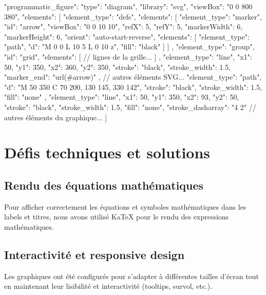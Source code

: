 \documentclass{article}
\begin{document}
\begin{tcolorbox}
"programmatic_figure": {
  "type": "diagram",
  "library": "svg",
  "viewBox": "0 0 800 380",
  "elements": [
    {
      "element_type": "defs",
      "elements": [
        {
          "element_type": "marker",
          "id": "arrow",
          "viewBox": "0 0 10 10",
          "refX": 5,
          "refY": 5,
          "markerWidth": 6,
          "markerHeight": 6,
          "orient": "auto-start-reverse",
          "elements": [
            {
              "element_type": "path",
              "d": "M 0 0 L 10 5 L 0 10 z",
              "fill": "black"
            }
          ]
        }
      ]
    },
    {
      "element_type": "group",
      "id": "grid",
      "elements": [
        // lignes de la grille...
      ]
    },
    {
      "element_type": "line",
      "x1": 50,
      "y1": 350,
      "x2": 360,
      "y2": 350,
      "stroke": "black",
      "stroke_width": 1.5,
      "marker_end": "url(#arrow)"
    },
    // autres éléments SVG...
    {
      "element_type": "path",
      "d": "M 50 350 C 70 200, 130 145, 330 142",
      "stroke": "black",
      "stroke_width": 1.5,
      "fill": "none"
    },
    {
      "element_type": "line",
      "x1": 50,
      "y1": 350,
      "x2": 93,
      "y2": 50,
      "stroke": "black",
      "stroke_width": 1.5,
      "fill": "none",
      "stroke_dasharray": "4 2"
    }
    // autres éléments du graphique...
  ]
}
\end{tcolorbox}



\section{Défis techniques et solutions}

\subsection{Rendu des équations mathématiques}

Pour afficher correctement les équations et symboles mathématiques dans les labels et titres, nous avons utilisé KaTeX pour le rendu des expressions mathématiques.

\subsection{Interactivité et responsive design}

Les graphiques ont été configurés pour s'adapter à différentes tailles d'écran tout en maintenant leur lisibilité et interactivité (tooltips, survol, etc.).
\end{document}
